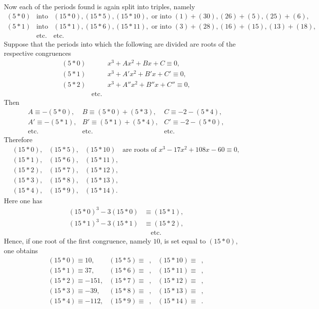 \documentclass[12pt]{article}
\begin{document}
Now each of the periods found is again split into triples, namely
\[
\begin{array}{rcl}
(5*0)&\text{into}&(15*0),(15*5),(15*10),\text{ or into }(1)+(30),(26)+(5),(25)+(6),\\
(5*1)&\text{into}&(15*1),(15*6),(15*11),\text{ or into }(3)+(28),(16)+(15),(13)+(18),\\
&\text{etc.}&\text{etc.}
\end{array}
\]
Suppose that the periods into which the following are divided are roots of the respective congruences
\[
\begin{array}{rcl}
(5*0)&&x^3+A x^2+B x+C\equiv 0,\\
(5*1)&&x^3+A'x^2+B'x+C'\equiv 0,\\
(5*2)&&x^3+A''x^2+B''x+C''\equiv 0,\\
&\text{etc.}&
\end{array}
\]
Then
\[
\begin{array}{lll}
A\equiv -(5*0),&B\equiv (5*0)+(5*3),&C\equiv -2-(5*4),\\
A'\equiv -(5*1),&B'\equiv (5*1)+(5*4),&C'\equiv -2-(5*0),\\
\text{etc.}&\text{etc.}&\text{etc.}
\end{array}
\]
Therefore
\[
\begin{array}{lll}
(15*0),&(15*5),&(15*10)\quad\text{are roots of }x^3-17x^2+108x-60\equiv 0,\\
(15*1),&(15*6),&(15*11),\\
(15*2),&(15*7),&(15*12),\\
(15*3),&(15*8),&(15*13),\\
(15*4),&(15*9),&(15*14).
\end{array}
\]
Here one has
\[
\begin{aligned}
(15*0)^3-3(15*0)&\equiv (15*1),\\
(15*1)^3-3(15*1)&\equiv (15*2),\\
&\quad\text{etc.}
\end{aligned}
\]
Hence, if one root of the first congruence, namely $10$, is set equal to $(15*0)$, one obtains
\[
\begin{array}{lll}
(15*0)\equiv 10,&(15*5)\equiv \phantom{0},&(15*10)\equiv \phantom{0},\\
(15*1)\equiv 37,&(15*6)\equiv \phantom{0},&(15*11)\equiv \phantom{0},\\
(15*2)\equiv -151,&(15*7)\equiv \phantom{0},&(15*12)\equiv \phantom{0},\\
(15*3)\equiv -39,&(15*8)\equiv \phantom{0},&(15*13)\equiv \phantom{0},\\
(15*4)\equiv -112,&(15*9)\equiv \phantom{0},&(15*14)\equiv \phantom{0}.
\end{array}
\]
\end{document}
